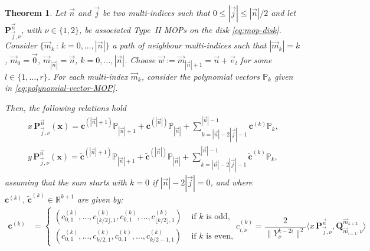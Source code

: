 \documentclass[10pt,a4paper]{amsart}
\newtheorem{theorem}{Theorem}
\begin{document}
    \begin{theorem}\label{th:NNRR-2-vars}
        Let $\vec n$ and $\vec j$ be two multi-indices such that $0\leq |\vec j|\leq|\vec n|/2$ and let $\mathbf P_{\vec j,\nu}^{\vec n}$, with $\nu\in\{1,2\}$, be associated Type~II MOPs on the disk \eqref{eq:mop-disk}. Consider $\{\vec m_k \,:\, k=0,\dots,|\vec n| \}$ a path of neighbour multi-indices such that $ |\vec m_k|=k$, $\vec m_0 = \vec 0$, $\vec m_{|\vec n|}=\vec n$, $k=0,\dots,|\vec n|$. Choose $\vec w := \vec m_{|\vec n|+1}=\vec n+\vec e_l$ for some $l\in\{1,\dots,r\}$. For each multi-index $\vec m_k$, consider the polynomial vectors $\mathbb P_k$ given in \eqref{eq:polynomial-vector-MOP}.
        
        Then, the following relations hold
        \begin{equation}
        \label{eq:NNR}
            \begin{aligned}
                x\, \mathbf P_{\vec j,\nu}^{\vec n}(\mathbf x) = \mathbf c^{(|\vec n|+1)}\mathbb P_{|\vec n|+1} + \mathbf c^{(|\vec n|)}\mathbb P_{|\vec n|} +  \sum_{k=|\vec n|-2|\vec j|-1}^{|\vec n|-1}\mathbf c^{(k)}\mathbb P_{k}, \\
                y\, \mathbf P_{\vec j,\nu}^{\vec n}(\mathbf x) = \tilde{\mathbf c}^{(|\vec n|+1)}\mathbb P_{|\vec n|+1} + \tilde{\mathbf c}^{(|\vec n|)}\mathbb P_{|\vec n|} +  \sum_{k=|\vec n|-2|\vec j|-1}^{|\vec n|-1}\tilde{\mathbf c}^{(k)}\mathbb P_{k}, 
            \end{aligned}
        \end{equation}
        assuming that the sum starts with $k=0$ if $|\vec n|-2|\vec j|=0$, and where $\mathbf c^{(k)},\,\tilde{\mathbf c}^{(k)}\in\mathbb R^{k+1}$ are given by:
        \begin{equation}
        \label{eq:NNRR-coefficients-x}
        \begin{aligned}
            \mathbf c^{(k)} &=\begin{cases}
                (c^{(k)}_{0,1},\dots,c^{(k)}_{\lfloor k/2 \rfloor ,1}, c^{(k)}_{0,1}, \dots, c^{(k)}_{\lfloor k/2 \rfloor,1}) & \text{ if }k \text{ is odd},\\
                (c^{(k)}_{0,1},\dots,c^{(k)}_{k/2,1}, c^{(k)}_{0,1}, \dots, c^{(k)}_{k/2-1,1}) & \text{ if }k \text{ is even}, 
            \end{cases} &
            c^{(k)}_{i,\nu} = \dfrac{2}{\|Y_{\nu}^{k-2i}\|^2} \langle x\, \mathbf P_{\vec j,\nu}^{\vec n}, \mathbf Q^{\vec m_{k+2}}_{\vec m_{i+1},\nu}\rangle
        \end{aligned}

\end{equation}
\end{theorem}
\end{document}
